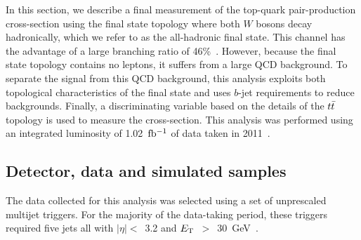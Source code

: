 
In this section, we describe a final measurement of the top-quark pair-production cross-section using the final state topology where both $W$ bosons decay hadronically, 
which we refer to as the all-hadronic final state.
This channel has the advantage of a large branching ratio of 46\%~\cite{ref:PDG}.
However, because the final state topology contains no leptons, it suffers from a large QCD background.
To separate the signal from this QCD background, this analysis exploits both topological characteristics
of the final state and uses $b$-jet requirements to reduce backgrounds.
Finally, a discriminating variable based on the details of the $t\bar{t}$ topology is used to measure the cross-section.
This analysis was performed using an integrated luminosity of 1.02~$\mbox{fb$^{-1}$}$ of data taken in 2011~\cite{ref:ATLAS}.



\subsection{Detector, data and simulated samples}
\label{sec:datasample}


The data collected for this analysis was selected using a set of unprescaled multijet triggers.
For the majority of the data-taking period, these triggers required five jets all with 
$|\eta| <$~3.2 and $E_{\mathrm{T}}$~$>$~30~GeV~\cite{ref:JetTrigger}.

